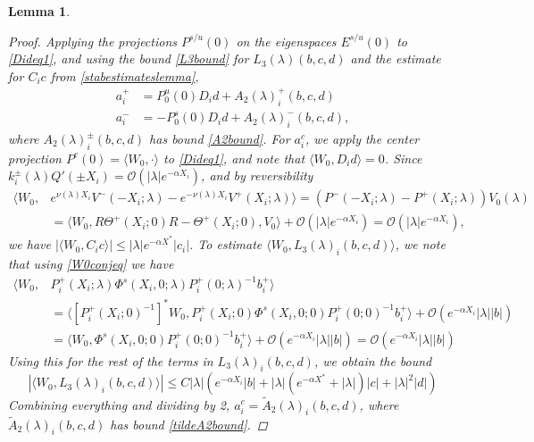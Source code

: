 \documentclass[10pt,reqno]{amsart}
\theoremstyle{plain}
\newtheorem{lemma}[theorem]{Lemma}
\theoremstyle{definition}
\theoremstyle{remark}
\numberwithin{theorem}{section}
\numberwithin{equation}{section}
\begin{document}
\begin{lemma}
\begin{proof}
Applying the projections $P^{s/u}(0)$ on the eigenspaces $E^{s/u}(0)$ to \eqref{Dideq1}, and using the bound \cref{L3bound} for $L_3(\lambda)(b, c, d)$ and the estimate for $C_i c$ from \cref{stabestimateslemma},
\begin{align*}
a_i^+ &= P_0^u(0) D_i d + A_2(\lambda)_i^+(b, c, d) \\
a_i^- &= -P_0^s(0) D_i d + A_2(\lambda)_i^-(b, c, d),
\end{align*}
where $A_2(\lambda)_i^\pm(b, c, d)$ has bound \cref{A2bound}. For $a_i^c$, we apply the center projection $P^c(0) = \langle W_0, \cdot \rangle$ to \eqref{Dideq1}, and note that $\langle W_0, D_i d\rangle = 0$. Since $k_i^\pm(\lambda)Q'(\pm X_i) = \mathcal{O}(|\lambda|e^{-\alpha X_i})$, and by reversibility
\begin{align*}
\langle W_0, &e^{\nu(\lambda) X_i} V^-(-X_i; \lambda) - e^{-\nu(\lambda) X_i} V^+(X_i; \lambda) \rangle = \left( P^-(-X_i; \lambda) - P^+(X_i; \lambda) \right) V_0(\lambda) \\
&= \langle W_0, R \Theta^+(X_i; 0) R - \Theta^+(X_i; 0), V_0 \rangle + \mathcal{O}(|\lambda|e^{-\alpha X_i}) = \mathcal{O}(|\lambda|e^{-\alpha X_i}),
\end{align*}
we have $|\langle W_0, C_i c\rangle| \leq |\lambda|e^{-\alpha X^*}|c_i|$. To estimate $\langle W_0, L_3(\lambda)_i(b,c,d) \rangle$, we note that using \cref{W0conjeq} we have
\begin{align*}
\langle W_0, &P_i^+(X_i; \lambda)\Phi^s(X_i, 0; \lambda)P_i^+(0; \lambda)^{-1} b_i^+ \rangle
\\
&= \langle [P_i^+(X_i; 0)^{-1}]^* W_0, P_i^+(X_i; 0)\Phi^s(X_i, 0; 0)P_i^+(0; 0)^{-1} b_i^+ \rangle + \mathcal{O}(e^{-\alpha X_i} |\lambda||b|) \\
&= \langle W_0, \Phi^s(X_i, 0; 0)P_i^+(0; 0)^{-1} b_i^+ \rangle + \mathcal{O}(e^{-\alpha X_i} |\lambda||b|) = \mathcal{O}(e^{-\alpha X_i} |\lambda||b|)
\end{align*}
Using this for the rest of the terms in $L_3(\lambda)_i(b, c, d)$, we obtain the bound
\begin{equation}\label{L3bound}
|\langle W_0, L_3(\lambda)_i(b, c, d) \rangle| \leq C |\lambda| \left( e^{-\alpha X_i} |b| + |\lambda|(e^{-\alpha X^*}+ |\lambda|) |c| + |\lambda|^2 |d| \right)
\end{equation}
Combining everything and dividing by 2, $a_i^c = \tilde{A}_2(\lambda)_i(b, c, d)$, where $\tilde{A}_2(\lambda)_i(b, c, d)$ has bound \cref{tildeA2bound}.
\end{proof}
\end{lemma}
\end{document}
